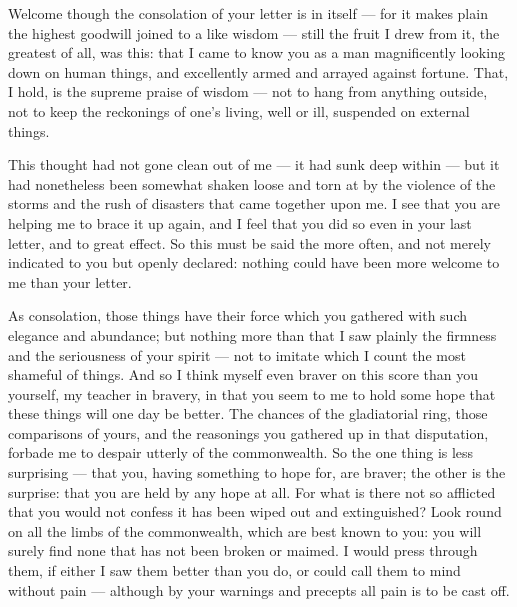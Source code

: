 

 Welcome though the consolation of your letter is in itself --- for it makes plain the highest goodwill joined to a like wisdom --- still the fruit I drew from it, the greatest of all, was this: that I came to know you as a man magnificently looking down on human things, and excellently armed and arrayed against fortune. That, I hold, is the supreme praise of wisdom --- not to hang from anything outside, not to keep the reckonings of one's living, well or ill, suspended on external things.

 This thought had not gone clean out of me --- it had sunk deep within --- but it had nonetheless been somewhat shaken loose and torn at by the violence of the storms and the rush of disasters that came together upon me. I see that you are helping me to brace it up again, and I feel that you did so even in your last letter, and to great effect. So this must be said the more often, and not merely indicated to you but openly declared: nothing could have been more welcome to me than your letter.

 As consolation, those things have their force which you gathered with such elegance and abundance; but nothing more than that I saw plainly the firmness and the seriousness of your spirit --- not to imitate which I count the most shameful of things. And so I think myself even braver on this score than you yourself, my teacher in bravery, in that you seem to me to hold some hope that these things will one day be better. The chances of the gladiatorial ring, those comparisons of yours, and the reasonings you gathered up in that disputation, forbade me to despair utterly of the commonwealth. So the one thing is less surprising --- that you, having something to hope for, are braver; the other is the surprise: that you are held by any hope at all. For what is there not so afflicted that you would not confess it has been wiped out and extinguished? Look round on all the limbs of the commonwealth, which are best known to you: you will surely find none that has not been broken or maimed. I would press through them, if either I saw them better than you do, or could call them to mind without pain --- although by your warnings and precepts all pain is to be cast off.

